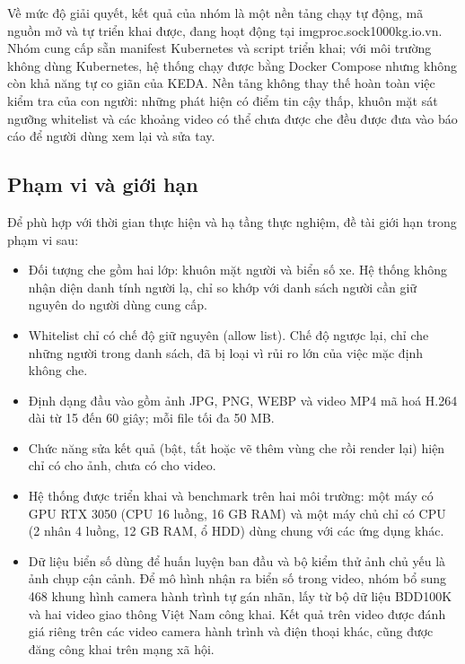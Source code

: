 \documentclass[a4paper,12pt]{article}
\begin{document}
Về mức độ giải quyết, kết quả của nhóm là một nền tảng chạy tự động, mã nguồn mở và tự triển khai được, đang hoạt động tại imgproc.sock1000kg.io.vn. Nhóm cung cấp sẵn manifest Kubernetes và script triển khai; với môi trường không dùng Kubernetes, hệ thống chạy được bằng Docker Compose nhưng không còn khả năng tự co giãn của KEDA. Nền tảng không thay thế hoàn toàn việc kiểm tra của con người: những phát hiện có điểm tin cậy thấp, khuôn mặt sát ngưỡng whitelist và các khoảng video có thể chưa được che đều được đưa vào báo cáo để người dùng xem lại và sửa tay.


\subsection{Phạm vi và giới hạn}

Để phù hợp với thời gian thực hiện và hạ tầng thực nghiệm, đề tài giới hạn trong phạm vi sau:

\begin{itemize}[leftmargin=*,itemsep=2pt,parsep=0pt]
  \item Đối tượng che gồm hai lớp: khuôn mặt người và biển số xe. Hệ thống không nhận diện danh tính người lạ, chỉ so khớp với danh sách người cần giữ nguyên do người dùng cung cấp.
  \item Whitelist chỉ có chế độ giữ nguyên (allow list). Chế độ ngược lại, chỉ che những người trong danh sách, đã bị loại vì rủi ro lớn của việc mặc định không che.
  \item Định dạng đầu vào gồm ảnh JPG, PNG, WEBP và video MP4 mã hoá H.264 dài từ 15 đến 60 giây; mỗi file tối đa 50 MB.
  \item Chức năng sửa kết quả (bật, tắt hoặc vẽ thêm vùng che rồi render lại) hiện chỉ có cho ảnh, chưa có cho video.
  \item Hệ thống được triển khai và benchmark trên hai môi trường: một máy có GPU RTX 3050 (CPU 16 luồng, 16 GB RAM) và một máy chủ chỉ có CPU (2 nhân 4 luồng, 12 GB RAM, ổ HDD) dùng chung với các ứng dụng khác.
  \item Dữ liệu biển số dùng để huấn luyện ban đầu và bộ kiểm thử ảnh chủ yếu là ảnh chụp cận cảnh. Để mô hình nhận ra biển số trong video, nhóm bổ sung 468 khung hình camera hành trình tự gán nhãn, lấy từ bộ dữ liệu BDD100K và hai video giao thông Việt Nam công khai. Kết quả trên video được đánh giá riêng trên các video camera hành trình và điện thoại khác, cũng được đăng công khai trên mạng xã hội.
\end{itemize}
\end{document}
